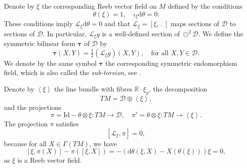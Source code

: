 \documentclass{amsart}
\theoremstyle{plain}
\theoremstyle{definition}
\newcommand{\bt}{{\boldsymbol{\tau}}}
\newcommand{\Real}{\mathbb{R}}
\newcommand{\1}{\mathbf{1}}
\newcommand{\D}{{\mathcal D}}
\renewcommand{\d}{\mathrm{d}}
\renewcommand{\L}{{\mathcal L}}
\newcommand{\+}{\oplus}
\begin{document}
 Denote by $\xi$ the corresponding Reeb vector field on $M$ defined by the conditions 
$$\theta(\xi)=1,\quad \iota_\xi \d\theta=0.$$  
These conditions imply $\L_\xi\d\theta =0$ and that $\L_\xi=[\xi, \,.\, ]$ maps sections of $\D$ to sections of $\D$.
In particular,  $\L_\xi g$ is a well-defined section of $\odot^2\D$. We define the symmetric bilinear form $\bt$ of $\D$ by
\begin{equation}\label{defA} \bt(X,Y)=\tfrac{1}{2}(\mathcal{L}_\xi g)(X,Y),\quad \text{for all } X,Y\in\D.\end{equation}
We denote by the same symbol $\bt$ the corresponding symmetric endomorphism field, which is also called the {\em sub-torsion}, see \cite{FG}.






Denote by $\left<\xi\right>$ the line bundle with fibres $\Real\cdot \xi_p$, 
the decomposition
$$TM=\D\oplus \left<\xi\right>,$$
and the projections  \begin{equation}\label{projections}
\pi =\mathrm{Id}-\theta\otimes \xi :TM\longrightarrow \D,\quad \pi' =\theta \otimes \xi :TM\longrightarrow \left<\xi\right>.\end{equation} The projection $\pi$ satisfies
\begin{equation}
\label{Lpi}
\left[ \mathcal L_\xi, \pi \right]=0,
\end{equation}
because for all $X\in \Gamma(TM)$, we have
\[
\left[ \xi,\pi(X)\right]- \pi\left( \left[\xi,X\right]\right)
=
-\left( \d\theta(\xi,X) - X(\theta(\xi))\right)\xi=
0,
\]
as $\xi$ is a Reeb vector field.
\end{document}
